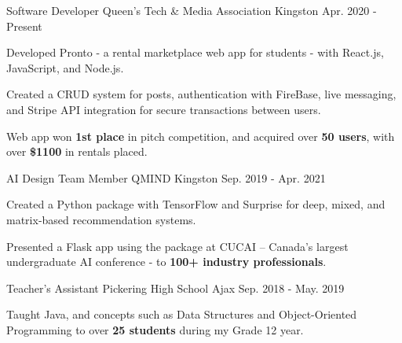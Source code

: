 

\begin{cventries}

  \cventry
    {Software Developer} %
    {Queen’s Tech \& Media Association} %
    {Kingston} %
    {Apr. 2020 - Present} %
    {
      \begin{cvitems} %
        \item {Developed Pronto - a rental marketplace web app for students - with React.js, JavaScript, and Node.js.}
        \item {Created a CRUD system for posts, authentication with FireBase, live messaging, and Stripe API integration for secure transactions between users.}
        \item {Web app won \textbf{1st place} in pitch competition, and acquired over \textbf{50 users}, with over \textbf{\$1100} in rentals placed.}
      \end{cvitems}
    }

  \cventry
    {AI Design Team Member} %
    {QMIND} %
    {Kingston} %
    {Sep. 2019 - Apr. 2021} %
    {
      \begin{cvitems} %
        \item {Created a Python package with TensorFlow and Surprise for deep, mixed, and matrix-based recommendation systems.}
        \item {Presented a Flask app using the package at CUCAI – Canada’s largest undergraduate AI conference - to \textbf{100+ industry professionals}.}
      \end{cvitems}
    }

  \cventry
    {Teacher's Assistant} %
    {Pickering High School} %
    {Ajax} %
    {Sep. 2018 - May. 2019} %
    {
      \begin{cvitems} %
        \item {Taught Java, and concepts such as Data Structures and Object-Oriented Programming to over \textbf{25 students} during my Grade 12 year.}
      \end{cvitems}
    }


\end{cventries}
